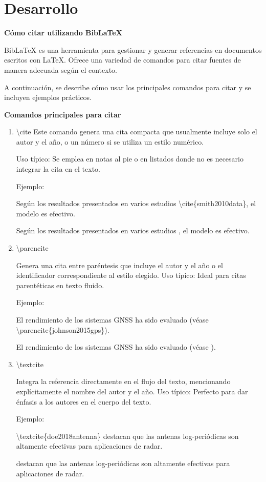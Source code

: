 \chapter{Desarrollo}

\textbf{Cómo citar utilizando BibLaTeX}

BibLaTeX es una herramienta  para gestionar y generar referencias en documentos escritos con LaTeX. Ofrece una variedad de comandos para citar fuentes de manera adecuada según el contexto.

A continuación, se describe cómo usar los principales comandos para citar y se incluyen ejemplos prácticos.

\textbf{Comandos principales para citar}

\begin{enumerate}
    \item \textbackslash cite
    Este comando genera una cita compacta que usualmente incluye solo el autor y el año, o un número si se utiliza un estilo numérico.

    Uso típico: Se emplea en notas al pie o en listados donde no es necesario integrar la cita en el texto.
    
    Ejemplo:
    
    
    Según los resultados presentados en varios estudios \textbackslash cite\{smith2010data\}, el modelo es efectivo.
    
    Según los resultados presentados en varios estudios \cite{smith2010data}, el modelo es efectivo.
    
    \item \textbackslash parencite

    Genera una cita entre paréntesis que incluye el autor y el año o el identificador correspondiente al estilo elegido.
    Uso típico: Ideal para citas parentéticas en texto fluido.

    Ejemplo:

    El rendimiento de los sistemas GNSS ha sido evaluado (véase \textbackslash parencite\{johnson2015gps\}).


    El rendimiento de los sistemas GNSS ha sido evaluado (véase \parencite{johnson2015gps}).

    \item \textbackslash textcite

    Integra la referencia directamente en el flujo del texto, mencionando explícitamente el nombre del autor y el año.
    Uso típico: Perfecto para dar énfasis a los autores en el cuerpo del texto.

    Ejemplo:

    \textbackslash textcite\{doe2018antenna\} destacan que las antenas log-periódicas son altamente efectivas para aplicaciones de radar.

    \textcite{doe2018antenna} destacan que las antenas log-periódicas son altamente efectivas para aplicaciones de radar.

\end{enumerate}

